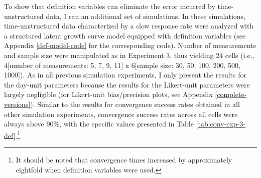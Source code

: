 \documentclass[
12pt, %
twoside,
english]{guelphthesis}
\begin{document}
To show that definition variables can eliminate the error incurred by time-unstructured data, I ran an additional set of simulations. In these simulations, time-unstructured data characterized by a slow response rate were analyzed with a structured latent growth curve model equipped with definition variables (see Appendix \ref{def-model-code} for the corresponding code). Number of measurements and sample size were manipulated as in Experiment 3, thus yielding 24 cells (i.e., 4{[}number of measurements: 5, 7, 9, 11{]} x 6{[}sample size: 30, 50, 100, 200, 500, 1000{]}). As in all previous simulation experiments, I only present the results for the day-unit parameters because the results for the Likert-unit parameters were largely negligible (for Likert-unit bias/precision plots, see Appendix \ref{complete-versions}). Similar to the results for convergence success rates obtained in all other simulation experiments, convergence success rates across all cells were always above 90\%, with the specific values presented in Table \ref{tab:conv-exp-3-def}.\footnote{It should be noted that convergence times increased by approximately eightfold when definition variables were used.}
\end{document}
